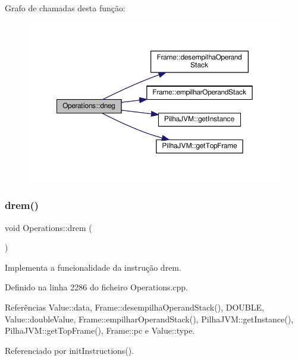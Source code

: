 Grafo de chamadas desta função\+:
\nopagebreak
\begin{figure}[H]
\begin{center}
\leavevmode
\includegraphics[width=350pt]{classOperations_a04f5d4f85b80f4c04216cd0259d3d7dc_cgraph}
\end{center}
\end{figure}
\mbox{\label{classOperations_abe333415749dbd2331ce89dc5e2233c5}} 
\subsubsection{\texorpdfstring{drem()}{drem()}}
{\footnotesize\ttfamily void Operations\+::drem (\begin{DoxyParamCaption}{ }\end{DoxyParamCaption})\hspace{0.3cm}{\ttfamily [private]}}



Implementa a funcionalidade da instrução drem. 



Definido na linha 2286 do ficheiro Operations.\+cpp.



Referências Value\+::data, Frame\+::desempilha\+Operand\+Stack(), D\+O\+U\+B\+LE, Value\+::double\+Value, Frame\+::empilhar\+Operand\+Stack(), Pilha\+J\+V\+M\+::get\+Instance(), Pilha\+J\+V\+M\+::get\+Top\+Frame(), Frame\+::pc e Value\+::type.



Referenciado por init\+Instructions().

